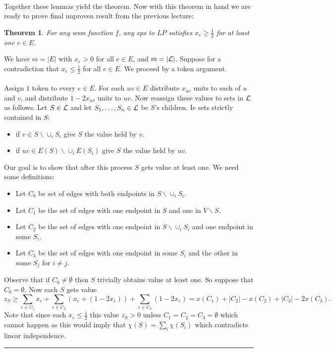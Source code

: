 \documentclass[letterpaper,12pt,oneside,onecolumn]{article}
\newenvironment{proof}{{\bf Proof:  }}{\hfill\rule{2mm}{2mm}}
\newtheorem{theorem}[fact]{Theorem}
\begin{document}
\paragraph{}
Together these lemmas yield the theorem. Now with this theorem in hand we are ready to prove final unproven result from the previous lecture:
\begin{theorem}
For any wsm function $f$, any xps to $LP$ satisfies $x_e \geq \frac{1}{2}$ for at least one $e \in E$.
\end{theorem}
\begin{proof}
We have $m =|E|$ with $x_e >0$ for all $e\in E$, and $m = |\mathcal{L}|$. Suppose for a contradiction that $x_e \leq \frac{1}{2}$ for all $e \in E$. We proceed by a token argument.
\paragraph{}
Assign $1$ token to every $e \in E$. For each $uv \in E$ distribute $x_{uv}$ units to each of $u$ and $v$, and distribute $1-2x_{uv}$ units to $uv$. Now reassign these values to sets in $\mathcal{L}$ as follows. Let $S \in \mathcal{L}$ and let $S_1,\dots, S_n \in \mathcal{L}$ be $S$'s children. Ie sets strictly contained in $S$:
\begin{itemize}
\item if $v \in S\backslash \cup_i S_i$ give $S$ the value held by $v$.
\item if $uv \in E(S) \backslash \cup_i E(S_i)$ give $S$ the value held by $uv$.
\end{itemize}
Our goal is to show that after this process $S$ gets value at least one. We need some definitions:
\begin{itemize}
\item Let $C_0$ be set of edges with both endpoints in $S\backslash \cup_i S_i$.
\item Let $C_1$ be the set of edges with one endpoint in $S$ and one in $V\backslash S$.
\item Let $C_2$ be the set of edges with one endpoint in $S\backslash \cup_i S_i$ and one endpoint in some $S_i$.
\item Let $C_3$ be the set of edges with one endpoint in some $S_i$ and the other in some $S_j$ for $i\neq j$.
\end{itemize}
Observe that if $C_0 \neq \emptyset$ then $S$ trivially obtains value at least one. So suppose that $C_0 = \emptyset$. Now each $S$ gets value
$$z_S \geq \sum_{e\in C_1} x_e + \sum_{e \in C_2}(x_e + (1-2x_e)) + \sum_{e \in C_3} (1-2x_e) = x(C_1) + |C_2| -x(C_2) + |C_3| - 2x(C_3).$$
Note that since each $x_e \leq \frac{1}{2}$ this value $z_S > 0$ unless $C_1 = C_2 = C_3 = \emptyset$ which cannot happen as this would imply that $\chi(S) = \sum_i \chi(S_i)$ which contradicts linear independence.

\end{proof}
\end{document}
